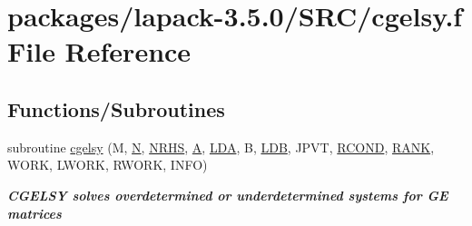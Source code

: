 \hypertarget{cgelsy_8f}{}\section{packages/lapack-\/3.5.0/\+S\+R\+C/cgelsy.f File Reference}
\label{cgelsy_8f}
\subsection*{Functions/\+Subroutines}
\begin{DoxyCompactItemize}
\item 
subroutine \hyperlink{group__complexGEsolve_ga9c3fdd95b68447e92700dffb218fc9db}{cgelsy} (M, \hyperlink{polmisc_8c_a0240ac851181b84ac374872dc5434ee4}{N}, \hyperlink{example__user_8c_aa0138da002ce2a90360df2f521eb3198}{N\+R\+H\+S}, \hyperlink{classA}{A}, \hyperlink{example__user_8c_ae946da542ce0db94dced19b2ecefd1aa}{L\+D\+A}, B, \hyperlink{example__user_8c_a50e90a7104df172b5a89a06c47fcca04}{L\+D\+B}, J\+P\+V\+T, \hyperlink{superlu__enum__consts_8h_af00a42ecad444bbda75cde1b64bd7e72a9b5c151728d8512307565994c89919d5}{R\+C\+O\+N\+D}, \hyperlink{splinemodule_8c_a3a88bcc63386de30443dacede2e01847}{R\+A\+N\+K}, W\+O\+R\+K, L\+W\+O\+R\+K, R\+W\+O\+R\+K, I\+N\+F\+O)
\begin{DoxyCompactList}\small\item\em {\bfseries  C\+G\+E\+L\+S\+Y solves overdetermined or underdetermined systems for G\+E matrices} \end{DoxyCompactList}\end{DoxyCompactItemize}
